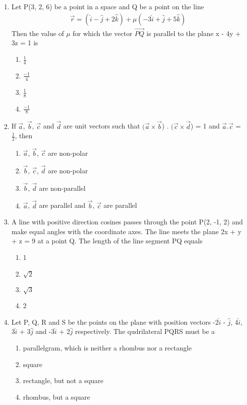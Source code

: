 \begin{enumerate}[label=\arabic*.,ref=\thesubsection.\theenumi]
\item Let P(3, 2, 6) be a point in a space and Q be a point on the line 
\begin{align*}
\overrightarrow{r} = (\hat{i} - \hat{j} + 2\hat{k}) + \mu(-3\hat{i} + \hat{j} + 5\hat{k})
\end{align*}
Then the value of $\mu$ for which the vector $\overrightarrow{PQ}$ is parallel to the plane x - 4y + 3z = 1 is
\begin{enumerate}
\item $\frac{1}{4}$
\item $\frac{-1}{4}$
\item $\frac{1}{8}$
\item $\frac{-1}{8}$
\end{enumerate}

\item If $\overrightarrow{a}$, $\overrightarrow{b}$, $\overrightarrow{c}$ and $\overrightarrow{d}$ are unit vectors such that $(\overrightarrow{a} \times \overrightarrow{b}$) . $(\overrightarrow{c} \times\overrightarrow{d}$) = 1 and $\overrightarrow{a}$.$\overrightarrow{c}$ = $\frac{1}{2}$, then
\begin{enumerate}
\item $\overrightarrow{a}$, $\overrightarrow{b}$, $\overrightarrow{c}$ are non-polar
\item $\overrightarrow{b}$, $\overrightarrow{c}$, $\overrightarrow{d}$ are non-polar
\item $\overrightarrow{b}$, $\overrightarrow{d}$ are non-parallel
\item $\overrightarrow{a}$, $\overrightarrow{d}$ are parallel and $\overrightarrow{b}$, $\overrightarrow{c}$ are parallel 
\end{enumerate}

\item A line with positive direction cosines passes through the point P(2, -1, 2) and make equal angles with the coordinate axes. The line meets the plane 2x + y + z = 9 at a point Q. The length of the line segment PQ equals
\begin{enumerate}
\item 1
\item $\sqrt{2}$
\item $\sqrt{3}$
\item 2
\end{enumerate}

\item Let P, Q, R and S be the points on the plane with position vectors -2$\hat{i}$ - $\hat{j}$, 4$\hat{i}$, 3$\hat{i}$ + 3$\hat{j}$ and -3$\hat{i}$ + 2$\hat{j}$ respectively. The qudrilateral PQRS must be a
\begin{enumerate}
\item parallelgram, which is neither a rhombus nor a rectangle
\item square
\item rectangle, but not a square
\item rhombus, but a square
\end{enumerate}


\end{enumerate}
